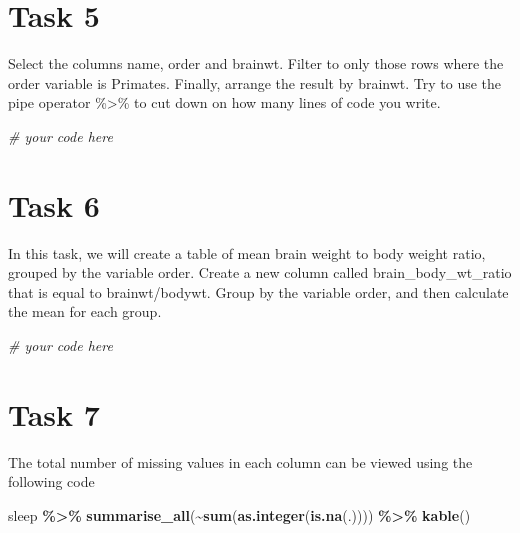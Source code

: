 \documentclass[
]{article}
\newenvironment{Shaded}{\begin{snugshade}}{\end{snugshade}}
\newcommand{\CommentTok}[1]{\textcolor[rgb]{0.56,0.35,0.01}{\textit{#1}}}
\newcommand{\FunctionTok}[1]{\textcolor[rgb]{0.13,0.29,0.53}{\textbf{#1}}}
\newcommand{\NormalTok}[1]{#1}
\newcommand{\SpecialCharTok}[1]{\textcolor[rgb]{0.81,0.36,0.00}{\textbf{#1}}}
\begin{document}
\section{Task 5}\label{task-5}

Select the columns name, order and brainwt. Filter to only those rows
where the order variable is Primates. Finally, arrange the result by
brainwt. Try to use the pipe operator \%\textgreater\% to cut down on
how many lines of code you write.

\begin{Shaded}
\begin{Highlighting}[]
\CommentTok{\# your code here}
\end{Highlighting}
\end{Shaded}

\section{Task 6}\label{task-6}

In this task, we will create a table of mean brain weight to body weight
ratio, grouped by the variable order. Create a new column called
brain\_body\_wt\_ratio that is equal to brainwt/bodywt. Group by the
variable order, and then calculate the mean for each group.

\begin{Shaded}
\begin{Highlighting}[]
\CommentTok{\# your code here}
\end{Highlighting}
\end{Shaded}

\section{Task 7}\label{task-7}

The total number of missing values in each column can be viewed using
the following code

\begin{Shaded}
\begin{Highlighting}[]
\NormalTok{sleep }\SpecialCharTok{\%\textgreater{}\%}
  \FunctionTok{summarise\_all}\NormalTok{(}\SpecialCharTok{\textasciitilde{}}\FunctionTok{sum}\NormalTok{(}\FunctionTok{as.integer}\NormalTok{(}\FunctionTok{is.na}\NormalTok{(.)))) }\SpecialCharTok{\%\textgreater{}\%}
  \FunctionTok{kable}\NormalTok{()}
\end{Highlighting}
\end{Shaded}
\end{document}
